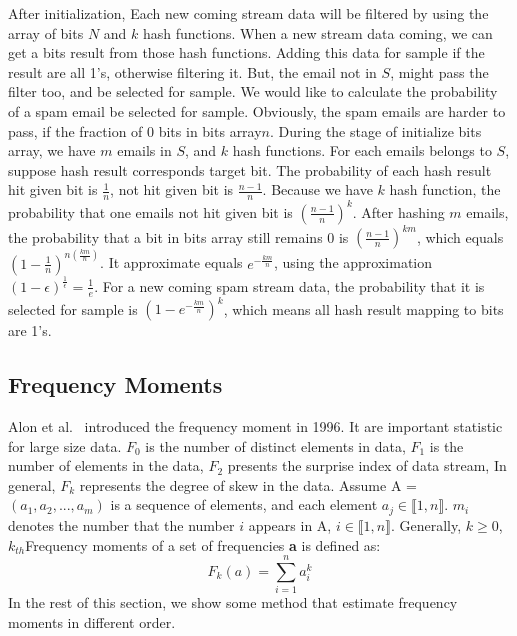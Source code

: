 After initialization, Each new coming stream data will be filtered by using the
array of bits $N$ and $k$ hash functions. When a new stream data coming, we can
get a bits result from those hash functions. Adding this data for sample if the
result are all 1's, otherwise filtering it.  But, the email not in $S$, might
pass the filter too, and be selected for sample. We would like to calculate the
probability of a spam email be selected for sample. Obviously, the spam emails
are harder to pass, if the fraction of 0 bits in bits array$n$. During the stage
of initialize bits array, we have $m$ emails in $S$, and $k$ hash functions. For
each emails belongs to $S$, suppose hash result corresponds target bit. The
probability of each hash result hit given bit is $\frac{1}{n}$, not hit given
bit is $\frac{n-1}{n}$. Because we have $k$ hash function, the probability that
one emails not hit given bit is $(\frac{n-1}{n})^k$. After hashing $m$ emails,
the probability that a bit in bits array still remains 0 is
$(\frac{n-1}{n})^{km}$, which equals  $(1-\frac{1}{n})^{n(\frac{km}{n})}$. It
approximate equals $e^{-\frac{km}{n}}$, using the approximation
$(1-\epsilon)^\frac{1}{\epsilon} = \frac{1}{e}$. For a new coming spam stream
data, the probability that it is selected for sample is
$(1-e^{-\frac{km}{n}})^k$, which means all hash result mapping to bits are 1's.

\subsection{Frequency Moments}
Alon et al.~\cite{alon1999space} introduced the frequency moment in 1996. It are
important statistic for large size data. $F_0$ is the number of distinct
elements in data, $F_1$ is the number of elements in the data, $F_2$ presents
the surprise index of data stream, In general, $F_k$ represents the degree of
skew in the data. Assume A = $(a_1,a_2,...,a_m)$ is a sequence of elements, and
each element $a_j \in \llbracket1, n\rrbracket$. $m_i$ denotes the number that
the number $i$ appears in A, $i \in \llbracket1, n\rrbracket$. Generally,
$k\geqslant0$, $k_{th}$Frequency moments of a set of frequencies \textbf{a} is
defined as: 
\begin{equation*}
F_k(a) = \sum_{i=1}^n a_i^k     
\end{equation*}
In the rest of this section, we show some method that estimate frequency moments
in different order. 

